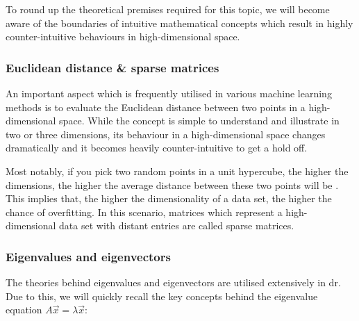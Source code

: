 To round up the theoretical premises required for this topic, we will become aware of the boundaries of intuitive mathematical concepts which result in highly counter-intuitive behaviours in high-dimensional space.

\subsubsection{Euclidean distance \& sparse matrices}

An important aspect which is frequently utilised in various machine learning methods is to evaluate the Euclidean distance between two points in a high-dimensional space.
While the concept is simple to understand and illustrate in two or three dimensions, its behaviour in a high-dimensional space changes dramatically and it becomes heavily counter-intuitive to get a hold off.

Most notably, if you pick two random points in a unit \gls{hypercube}, the higher the dimensions, the higher the average distance between these two points will be \cite{HandsOnMLCh8}.
This implies that, the higher the dimensionality of a data set, the higher the chance of overfitting.
In this scenario, matrices which represent a high-dimensional data set with distant entries are called sparse matrices.

\vspace{2mm}



\subsubsection{Eigenvalues and eigenvectors}

The theories behind eigenvalues and eigenvectors are utilised extensively in \acrlong{dr}.
Due to this, we will quickly recall the key concepts behind the eigenvalue equation $A \overrightarrow{x} = \lambda \overrightarrow{x}$:


